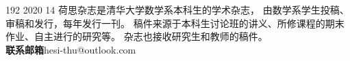 \documentclass{article}
\begin{document}
    \MakeCover
    {   %
        192
    }{  %
        2020
    }{  %
        14
    }{  %
        荷思杂志是清华大学数学系本科生的学术杂志，
        由数学系学生投稿、审稿和发行，每年发行一刊。
        稿件来源于本科生讨论班的讲义、所修课程的期末作业、自主进行的研究等。
        杂志也接收研究生和教师的稿件。 \\[5pt]
        \textbf{联系邮箱}\quad hesi-thu@outlook.com
    }
\end{document}
